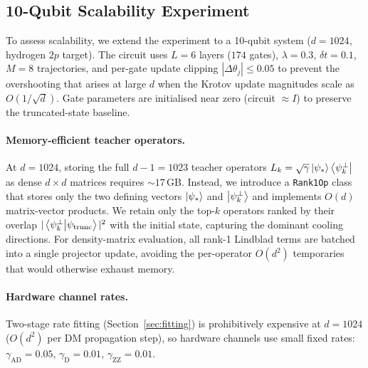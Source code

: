 \documentclass[11pt,a4paper]{article}
\begin{document}
\subsection{10-Qubit Scalability Experiment}

To assess scalability, we extend the experiment to a 10-qubit system
($d = 1024$, hydrogen $2p$ target).  The circuit uses $L = 6$ layers
($174$ gates), $\lambda = 0.3$, $\delta t = 0.1$, $M = 8$ trajectories,
and per-gate update clipping $|\Delta\theta_j| \le 0.05$ to prevent
the overshooting that arises at large $d$ when the Krotov update
magnitudes scale as $O(1/\sqrt{d})$.  Gate parameters are initialised
near zero (circuit $\approx I$) to preserve the truncated-state
baseline.

\paragraph{Memory-efficient teacher operators.}
At $d = 1024$, storing the full $d - 1 = 1023$ teacher operators
$L_k = \sqrt{\gamma}\ket{\psi_*}\bra{\psi_k^\perp}$ as dense
$d \times d$ matrices requires ${\sim}17\,\text{GB}$.  Instead, we
introduce a \texttt{Rank1Op} class that stores only the two defining
vectors $\ket{\psi_*}$ and $\ket{\psi_k^\perp}$ and implements
$O(d)$ matrix-vector products.  We retain only the top-$k$ operators
ranked by their overlap $|\braket{\psi_k^\perp}{\psi_\text{trunc}}|^2$
with the initial state, capturing the dominant cooling directions.
For density-matrix evaluation, all rank-1 Lindblad terms are batched
into a single projector update, avoiding the per-operator $O(d^2)$
temporaries that would otherwise exhaust memory.

\paragraph{Hardware channel rates.}
Two-stage rate fitting (Section~\ref{sec:fitting}) is prohibitively
expensive at $d = 1024$ ($O(d^2)$ per DM propagation step), so
hardware channels use small fixed rates:
$\gamma_\text{AD} = 0.05$, $\gamma_\text{D} = 0.01$,
$\gamma_\text{ZZ} = 0.01$.
\end{document}
